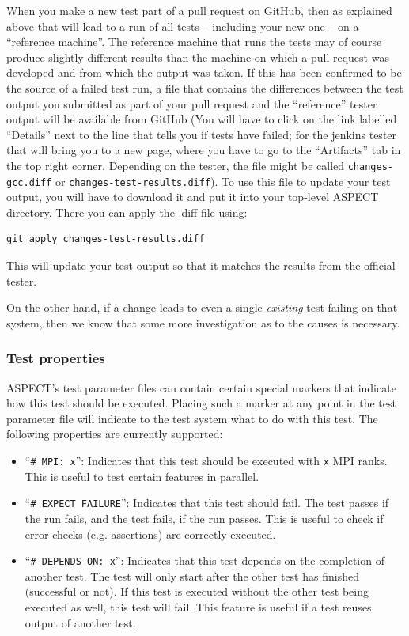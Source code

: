 \documentclass{article}
\newcommand{\aspect}{\textsc{ASPECT}}
\begin{document}
When you make a new test part of a pull request on GitHub, then as explained
above that will lead to a run of all tests -- including your new one -- on a
``reference machine''. The reference machine that runs the tests may of course
produce slightly different results than the machine on which a pull request was
developed and from which the output was taken. If this has been confirmed to be
the source of a failed test run, a file that contains the differences between
the test output you submitted as part of your pull request and the ``reference'' tester output
will be available from GitHub (You will have to click on the link labelled ``Details''
next to the line that tells you if tests have failed; for the jenkins tester that
will bring you to a new page, where you have to go to the ``Artifacts'' tab in the top
right corner. Depending on the tester, the file might be called \texttt{changes-gcc.diff}
or \texttt{changes-test-results.diff}). To use this file to update your test output, you
will have to download it and put it into your top-level \aspect{} directory. There you
can apply the .diff file using:
\begin{lstlisting}[frame=single,language=ksh]
  git apply changes-test-results.diff
\end{lstlisting}
This will update your test output so that it matches the results from the official tester.

On the other hand,
if a change leads to even a single \textit{existing} test failing on that
system, then we know that some more investigation as to the causes is necessary.

\subsubsection{Test properties}
\label{sec:test_properties}

\aspect{}'s test parameter files can contain certain special markers that
indicate how this test should be executed. Placing such a marker at any
point in the test parameter file will indicate to the test system what
to do with this test. The following properties are currently supported:

\begin{itemize}
  \item ``\texttt{\# MPI: x}'': Indicates that this test should be executed with
    \texttt{x} MPI ranks. This is useful to test certain features in
    parallel.
  \item ``\texttt{\# EXPECT FAILURE}'': Indicates that this test should fail.
    The test passes if the run fails, and the test fails, if the run
    passes. This is
    useful to check if error checks (e.g. assertions) are correctly
    executed.
  \item ``\texttt{\# DEPENDS-ON: x}'': Indicates that this test depends on the
    completion of another test. The test will only start after the other
    test has finished (successful or not). If this test is executed without
    the other test being executed as well, this test will fail. This
    feature is useful if a test reuses output of another test.
\end{itemize}
\end{document}

